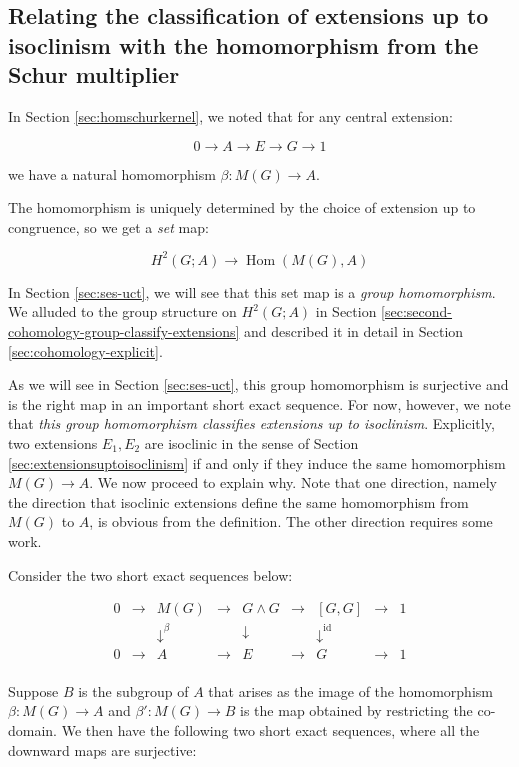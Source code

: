 \subsection{Relating the classification of extensions up to isoclinism with the homomorphism from the Schur multiplier}\label{sec:beta-map}

In Section \ref{sec:homschurkernel}, we noted that for any central extension:

$$0 \to A \to E \to G \to 1$$

we have a natural homomorphism $\beta: M(G) \to A$.

The homomorphism is uniquely determined by the choice of extension up
to congruence, so we get a {\em set} map:

$$H^2(G;A) \to \operatorname{Hom}(M(G),A)$$

In Section \ref{sec:ses-uct}, we will see that this set map is a {\em
  group homomorphism}. We alluded to the group structure on $H^2(G;A)$
in Section \ref{sec:second-cohomology-group-classify-extensions} and
described it in detail in Section \ref{sec:cohomology-explicit}.

As we will see in Section \ref{sec:ses-uct}, this group homomorphism
is surjective and is the right map in an important short exact
sequence. For now, however, we note that {\em this group homomorphism
  classifies extensions up to isoclinism}. Explicitly, two extensions
$E_1,E_2$ are isoclinic in the sense of Section
\ref{sec:extensionsuptoisoclinism} if and only if they induce the same
homomorphism $M(G) \to A$. We now proceed to explain why. Note that
one direction, namely the direction that isoclinic extensions define
the same homomorphism from $M(G)$ to $A$, is obvious from the
definition. The other direction requires some work.

Consider the two short exact sequences below:

$$\begin{array}{ccccccccc}
0 & \to & M(G) & \to & G \wedge G & \to & [G,G] & \to & 1\\
 &&   \downarrow^{\beta}  &&  \downarrow     && \downarrow^{\text{id}} && \\
0 & \to & A &\to & E & \to & G & \to & 1\\
\end{array}$$

Suppose $B$ is the subgroup of $A$ that arises as the image of the
homomorphism $\beta: M(G) \to A$ and $\beta':M(G) \to B$ is the map
obtained by restricting the co-domain. We then have the following two
short exact sequences, where all the downward maps are surjective:

